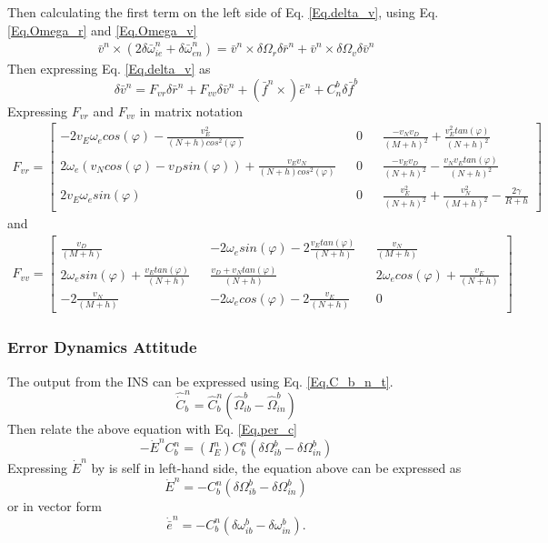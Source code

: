 Then calculating the first term on the left side of Eq. \eqref{Eq.delta_v}, using Eq. \eqref{Eq.Omega_r} and \eqref{Eq.Omega_v}
\begin{align}
\bar{v}^n\times(2\delta \bar{\omega}_{ie}^n+\delta \bar{\omega}_{en}^n) = 
\bar{v}^n \times \delta\Omega_r\delta\bar{r}^n +\bar{v}^n\times\delta\Omega_v\delta\bar{v}^n
\end{align}
Then expressing Eq. \eqref{Eq.delta_v} as
\begin{equation}
\delta\bar{v}^n = F_{vr}\delta\bar{r}^n + F_{vv}\delta\bar{v}^n + (\bar{f}^n	\times)\bar{e}^n + C_n^b\delta \bar{f}^b
\end{equation}
Expressing $F_{vr}$ and $F_{vv}$ in matrix notation
\begin{align}
F_{vr} = 
\begin{bmatrix}
-2v_E\omega_e cos(\varphi)-\frac{v_E^2}{(N+h)cos^2(\varphi)} && 0 && \frac{-v_N v_D}{(M+h)^2} + \frac{v_E^2 tan(\varphi)}{(N+h)^2} \\
2\omega_e(v_N cos(\varphi)-v_D sin(\varphi)) + \frac{v_Ev_N}{(N+h)cos^2(\varphi)} && 0 && \frac{-v_E v_D}{(N+h)^2} - \frac{v_Nv_E tan(\varphi)}{(N+h)^2} \\
2v_E\omega_e sin(\varphi) && 0 && \frac{v_E^2}{(N+h)^2} + \frac{v_N^2}{(M+h)^2} - \frac{2\gamma}{R+h}
\end{bmatrix}
\label{Eq.Fvr}
\end{align}
and
\begin{align}
F_{vv} = 
\begin{bmatrix}
\frac{v_D}{(M+h)} && -2\omega_e sin(\varphi) -2\frac{v_Etan(\varphi)}{(N+h)} && \frac{v_N}{(M+h)} \\
2\omega_e sin(\varphi) +\frac{v_E tan(\varphi)}{(N+h)} && \frac{v_D + v_N tan(\varphi)}{(N+h)} && 2\omega_e cos(\varphi)+ \frac{v_E}{(N+h)} \\
-2\frac{v_N}{(M+h)} && -2\omega_e cos(\varphi) -2\frac{v_E}{(N+h)} && 0
\end{bmatrix}
\label{Eq.Fvv}
\end{align}
\subsubsection{Error Dynamics Attitude}
The output from the INS can be expressed using Eq. \eqref{Eq.C_b_n_t}.
\begin{equation}
\hat{\dot{C}}_b^n = \hat{C}_b^n(\hat{\Omega}_{ib}^b - \hat{\Omega}_{in}^b)
\end{equation}
Then relate the above equation with Eq. \eqref{Eq.per_c}
\begin{equation}
-\dot{E}^nC_b^n = (I_E^n)C_b^n(\delta\Omega_{ib}^b-\delta\Omega_{in}^b)
\end{equation}
Expressing $\dot{E}^n$ by is self in left-hand side, the equation above can be expressed as
\begin{equation}
\dot{E}^n = -C_b^n(\delta\Omega_{ib}^b-\delta\Omega_{in}^b)
\end{equation}
or in vector form
\begin{equation}
\dot{\bar{e}}^n = -C_b^n(\delta\omega_{ib}^b-\delta\omega_{in}^b).
\label{Eq.error_vec}
\end{equation}

